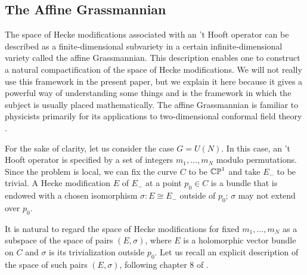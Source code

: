 
\subsection{The Affine Grassmannian}\label{sec:affgrass}

The space of Hecke modifications associated with an 't Hooft
operator can be described as a finite-dimensional subvariety in a
certain infinite-dimensional variety called the affine
Grassmannian. This description enables one to construct a natural
compactification of the space of Hecke modifications.  We will not
really use this framework in the present paper, but we explain it
here because it gives a powerful way of understanding some things
and is the framework in which the subject is usually placed
mathematically. The affine Grassmannian is familiar to physicists
primarily for its applications to two-dimensional conformal field
theory \cite{ref122}.

For the sake of clarity, let us consider the case $G=U(N)$. In
this case, an 't Hooft operator is specified by a set of integers
$m_1,\ldots,m_N$ modulo permutations. Since the problem is local,
we can fix the curve $C$ to be $\Bbb{CP}^1$ and take $E_-$ to be
trivial.  A Hecke modification $E$ of $E_-$ at a point $p_0\in C$
is a bundle that is endowed with a chosen isomorphism
$\sigma:E\cong E_-$ outside of $p_0$; $\sigma$ may not extend over
$p_0$.

It is natural to regard the space of Hecke modifications for fixed
$m_1,\ldots,m_N$ as a subspace of the space of pairs $(E,\sigma)$,
where $E$ is a holomorphic vector bundle on $C$ and $\sigma$ is
its trivialization outside $p_0$. Let us recall an explicit
description of the space of such pairs $(E,\sigma)$, following
chapter 8 of \cite{ref122}.

